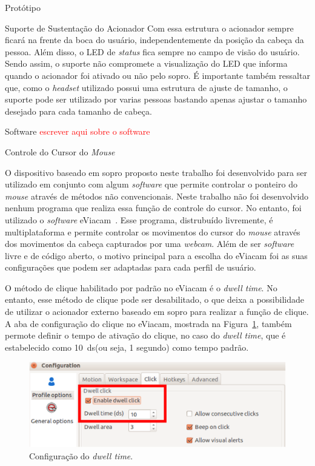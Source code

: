 \begin{chapter}{Protótipo}
\begin{section}{Suporte de Sustentação do Acionador}
Com essa estrutura o acionador sempre ficará na frente da boca do usuário,
independentemente da posição da cabeça da pessoa. Além disso, o LED de
\textit{status} fica sempre no campo de visão do usuário. Sendo assim, o suporte
não compromete a visualização do LED que informa quando o acionador foi ativado
ou não pelo sopro. É importante também ressaltar que, como o \textit{headset}
utilizado possui uma estrutura de ajuste de tamanho, o suporte pode ser
utilizado por varias pessoas bastando apenas ajustar o tamanho desejado para
cada tamanho de cabeça. 

\end{section}

\begin{section}{Software}
\textcolor{red}{escrever aqui sobre o software}
\end{section}


\begin{section}{Controle do Cursor do \textit{Mouse}}

O dispositivo baseado em sopro proposto neste trabalho foi desenvolvido para ser
utilizado em conjunto com algum \textit{software} que permite controlar o
ponteiro do \textit{mouse} através de métodos não convencionais. Neste trabalho
não foi desenvolvido nenhum programa que realiza essa função de controle do
cursor. No entanto, foi utilizado o \textit{software} eViacam~\cite{eviacam}.
Esse programa, distrubuído livremente, é multiplataforma e permite controlar os
movimentos do cursor do \textit{mouse} através dos movimentos da cabeça
capturados por uma \textit{webcam}. Além de ser \textit{software} livre e de
código aberto, o motivo principal para a escolha do eViacam foi as suas
configurações que podem ser adaptadas para cada perfil de usuário.

O método de clique habilitado por padrão no eViacam é o \textit{dwell time}. No
entanto, esse método de clique pode ser desabilitado, o que deixa a
possibilidade de utilizar o acionador externo baseado em sopro para realizar a
função de clique. A aba de configuração do clique no eViacam, mostrada na
Figura~\ref{fig:click}, também permote definir o tempo de ativação do clique, no
caso do \textit{dwell time}, que é estabelecido como 10~ds(ou seja, 1 segundo)
como tempo padrão. 

\begin{figure}[!h]
	\centering
	\begin{minipage}[c]{\textwidth}
	\centering
	\includegraphics[width=0.7\linewidth]{fig/eviacamclick}
	\caption{Configuração do \textit{dwell time}.}
	\label{fig:click}
	\end{minipage}
\end{figure}
 

\end{section}
\end{chapter}
